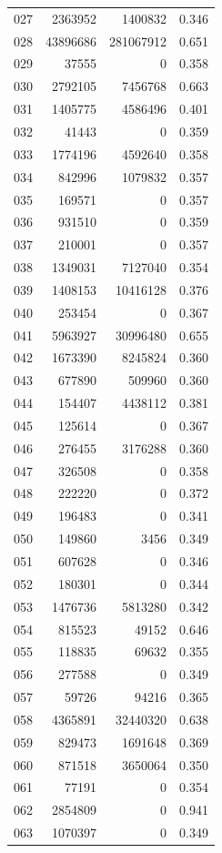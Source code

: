\documentclass[anonymous,notoc]{gmcm2026}
\begin{document}
\begin{longtable}{lrrr}
027 & 2363952 & 1400832 & 0.346 \\
028 & 43896686 & 281067912 & 0.651 \\
029 & 37555 & 0 & 0.358 \\
030 & 2792105 & 7456768 & 0.663 \\
031 & 1405775 & 4586496 & 0.401 \\
032 & 41443 & 0 & 0.359 \\
033 & 1774196 & 4592640 & 0.358 \\
034 & 842996 & 1079832 & 0.357 \\
035 & 169571 & 0 & 0.357 \\
036 & 931510 & 0 & 0.359 \\
037 & 210001 & 0 & 0.357 \\
038 & 1349031 & 7127040 & 0.354 \\
039 & 1408153 & 10416128 & 0.376 \\
040 & 253454 & 0 & 0.367 \\
041 & 5963927 & 30996480 & 0.655 \\
042 & 1673390 & 8245824 & 0.360 \\
043 & 677890 & 509960 & 0.360 \\
044 & 154407 & 4438112 & 0.381 \\
045 & 125614 & 0 & 0.367 \\
046 & 276455 & 3176288 & 0.360 \\
047 & 326508 & 0 & 0.358 \\
048 & 222220 & 0 & 0.372 \\
049 & 196483 & 0 & 0.341 \\
050 & 149860 & 3456 & 0.349 \\
051 & 607628 & 0 & 0.346 \\
052 & 180301 & 0 & 0.344 \\
053 & 1476736 & 5813280 & 0.342 \\
054 & 815523 & 49152 & 0.646 \\
055 & 118835 & 69632 & 0.355 \\
056 & 277588 & 0 & 0.349 \\
057 & 59726 & 94216 & 0.365 \\
058 & 4365891 & 32440320 & 0.638 \\
059 & 829473 & 1691648 & 0.369 \\
060 & 871518 & 3650064 & 0.350 \\
061 & 77191 & 0 & 0.354 \\
062 & 2854809 & 0 & 0.941 \\
063 & 1070397 & 0 & 0.349 \\

\end{longtable}
\end{document}
